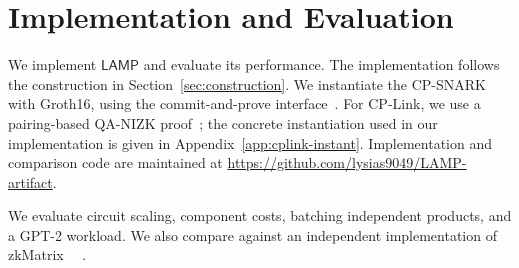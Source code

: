\documentclass[conference,compsoc]{IEEEtran}
\makeatletter
\newcommand{\mat}{\mathbf}          %
\newcommand{\protocol}{\textsf{LAMP}}   %
\theoremstyle{plain}
\theoremstyle{definition}
\theoremstyle{remark}
\newtheorem{remark}{Remark}
\providecommand{\DIFaddtex}[1]{{\protect\color{blue}\uwave{#1}}} %
\providecommand{\DIFdeltex}[1]{{\protect\color{red}\sout{#1}}} %
\providecommand{\DIFaddbegin}{} %
\providecommand{\DIFaddend}{} %
\providecommand{\DIFdelbegin}{} %
\providecommand{\DIFdelend}{} %
\providecommand{\DIFadd}[1]{\texorpdfstring{\DIFaddtex{#1}}{#1}} %
\providecommand{\DIFdel}[1]{\texorpdfstring{\DIFdeltex{#1}}{}} %
\let\sout@orig\sout %
\renewcommand{\sout}[1]{\ifmmode\text{\sout@orig{\ensuremath{#1}}}\else\sout@orig{#1}\fi} %
\renewcommand{\DIFaddtex}[1]{{\protect\color{DiffBlue}#1}}
\renewcommand{\DIFdeltex}[1]{}
\makeatother
\begin{document}




\section{Implementation and Evaluation}
\label{sec:implementation}

We implement \(\protocol\) and evaluate its performance. The implementation follows the construction in Section~\ref{sec:construction}.  We instantiate the CP-SNARK with Groth16, using the commit-and-prove
interface~\cite{gnark,legosnark}.  For CP-Link, we use a pairing-based QA-NIZK
proof~\cite{qa-nizk}; the concrete instantiation used in our implementation is
given in Appendix~\ref{app:cplink-instant}. \DIFdelbegin \DIFdel{The implementation is available at }%
\DIFdelend \DIFaddbegin \DIFadd{Implementation and comparison code
are maintained at }\textcolor{DiffBlue}{\url{https://github.com/lysias9049/LAMP-artifact}}\DIFaddend .

\DIFdelbegin \DIFdel{Our evaluation is organized around four questions.  First, does the number of  constraints of \(\protocol\) scale linearly with the matrix dimension, as predicted by Section~\ref{sec:protocol-complexity}?  Second,
which components dominate proving time, proof size, and verification time?  Third, how does \(\protocol\) behave when proving multiple independent claims \(\mat{A}_i\mat{B}_i=\mat{C}_i\) in a batch, rather than a single product \(\mat{A}\mat{B}=\mat{C}\)?  Fourth, does the advantage remain useful on a neural-network workload? }%
\DIFdelend \DIFaddbegin \DIFadd{We evaluate circuit scaling, component costs, batching independent products,
and a GPT-2 workload. We also compare against an independent implementation
of zkMatrix~\mbox{%
\cite{cong2024zkmatrix}}\hskip0pt%
.
}\DIFaddend 
\end{document}
